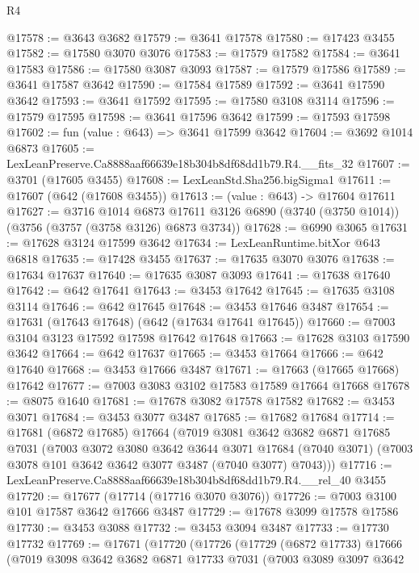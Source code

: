 \begin{lexlean}{R4}
\begin{coremodule}
@17578 := @3643 @3682
@17579 := @3641 @17578
@17580 := @17423 @3455
@17582 := @17580 @3070 @3076
@17583 := @17579 @17582
@17584 := @3641 @17583
@17586 := @17580 @3087 @3093
@17587 := @17579 @17586
@17589 := @3641 @17587 @3642
@17590 := @17584 @17589
@17592 := @3641 @17590 @3642
@17593 := @3641 @17592
@17595 := @17580 @3108 @3114
@17596 := @17579 @17595
@17598 := @3641 @17596 @3642
@17599 := @17593 @17598
@17602 := fun (value : @643) => @3641 @17599 @3642
@17604 := @3692 @1014 @6873
@17605 := LexLeanPreserve.Ca8888aaf66639e18b304b8df68dd1b79.R4.__fits_32
@17607 := @3701 (@17605 @3455)
@17608 := LexLeanStd.Sha256.bigSigma1
@17611 := @17607 (@642 (@17608 @3455))
@17613 := (value : @643) -> @17604 @17611
@17627 := @3716
    @1014
    @6873
    @17611
    @3126
    @6890
    (@3740 (@3750 @1014))
    (@3756 (@3757 (@3758 @3126) @6873 @3734))
@17628 := @6990 @3065
@17631 := @17628 @3124 @17599 @3642
@17634 := LexLeanRuntime.bitXor @643 @6818
@17635 := @17428 @3455
@17637 := @17635 @3070 @3076
@17638 := @17634 @17637
@17640 := @17635 @3087 @3093
@17641 := @17638 @17640
@17642 := @642 @17641
@17643 := @3453 @17642
@17645 := @17635 @3108 @3114
@17646 := @642 @17645
@17648 := @3453 @17646 @3487
@17654 := @17631 (@17643 @17648) (@642 (@17634 @17641 @17645))
@17660 := @7003 @3104 @3123 @17592 @17598 @17642 @17648
@17663 := @17628 @3103 @17590 @3642
@17664 := @642 @17637
@17665 := @3453 @17664
@17666 := @642 @17640
@17668 := @3453 @17666 @3487
@17671 := @17663 (@17665 @17668) @17642
@17677 := @7003 @3083 @3102 @17583 @17589 @17664 @17668
@17678 := @8075 @1640
@17681 := @17678 @3082 @17578 @17582
@17682 := @3453 @3071
@17684 := @3453 @3077 @3487
@17685 := @17682 @17684
@17714 := @17681
    (@6872 @17685)
    @17664
    (@7019
      @3081
      @3642
      @3682
      @6871
      @17685
      @7031
      (@7003
        @3072
        @3080
        @3642
        @3644
        @3071
        @17684
        (@7040 @3071)
        (@7003 @3078 @101 @3642 @3642 @3077 @3487 (@7040 @3077) @7043)))
@17716 := LexLeanPreserve.Ca8888aaf66639e18b304b8df68dd1b79.R4.__rel_40 @3455
@17720 := @17677 (@17714 (@17716 @3070 @3076))
@17726 := @7003 @3100 @101 @17587 @3642 @17666 @3487
@17729 := @17678 @3099 @17578 @17586
@17730 := @3453 @3088
@17732 := @3453 @3094 @3487
@17733 := @17730 @17732
@17769 := @17671
    (@17720
      (@17726
        (@17729
          (@6872 @17733)
          @17666
          (@7019
            @3098
            @3642
            @3682
            @6871
            @17733
            @7031
            (@7003
              @3089
              @3097
              @3642

\end{coremodule}
\end{lexlean}
